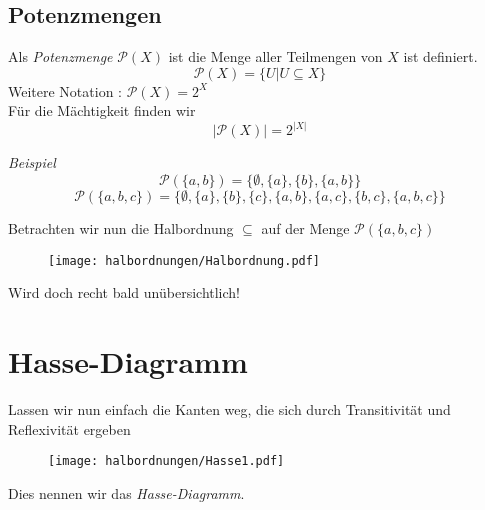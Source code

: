 \subsection{Potenzmengen}
\begin{frame}
	\begin{Definition}
		Als \emph{Potenzmenge} $\mathcal{P}(X)$ ist die Menge aller Teilmengen von $X$ ist definiert. $$ \mathcal{P}(X) = \{ U | U\subseteq X\} $$
		Weitere Notation : $ \mathcal{P}(X) = 2^X $ \\
		
		Für die Mächtigkeit finden wir $$ \vert \mathcal{P}(X) \vert = 2^{\vert X \vert} $$
	\end{Definition} 
	\pause 
	\emph{Beispiel}
	$$ \mathcal{P}(\{a,b\}) = \{ \emptyset, \{a\}, \{b\}, \{a,b\} \} $$
	\pause
	$$\mathcal{P}(\{a,b,c\}) = \{ \emptyset, \{a\}, \{b\}, \{c\}, \{a,b\}, \{a,c\}, \{b,c\}, \{a,b,c\} \} $$
\end{frame}

\begin{frame}
	Betrachten wir nun die Halbordnung $\subseteq$ auf der Menge $\mathcal{P}(\{a,b,c\})$ \pause
	\begin{figure}[H]
		\centering
		\texttt{[image: halbordnungen/Halbordnung.pdf]}
	\end{figure} \pause
	Wird doch recht bald unübersichtlich!
\end{frame}

\section{Hasse-Diagramm}
\begin{frame}
Lassen wir nun einfach die Kanten weg, die sich durch Transitivität und Reflexivität ergeben \pause
\begin{figure}[H]
	\centering
	\texttt{[image: halbordnungen/Hasse1.pdf]}
\end{figure} \pause
Dies nennen wir das \emph{Hasse-Diagramm}.
\end{frame}

